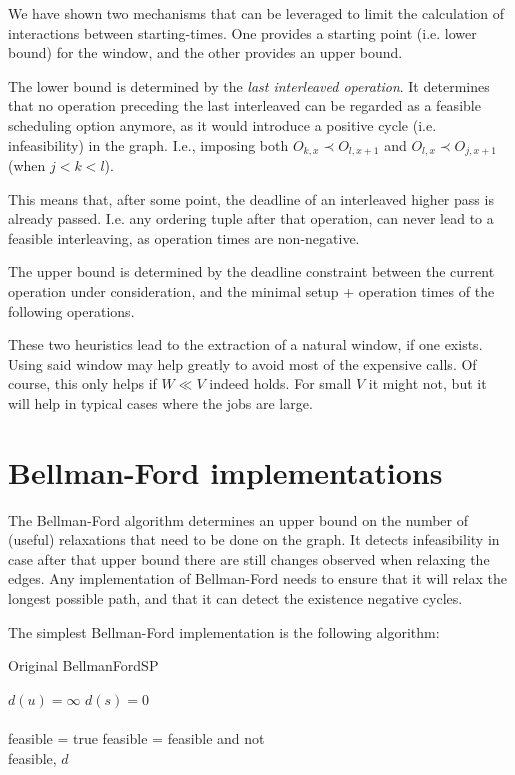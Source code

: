 \documentclass[]{article}
\begin{document}
We have shown two mechanisms that can be leveraged to limit the calculation of interactions between starting-times. One provides a starting point (i.e. lower bound) for the window, and the other provides an upper bound.

The lower bound is determined by the \textit{last interleaved operation}. It determines that no operation preceding the last interleaved can be regarded as a feasible scheduling option anymore, as it would introduce a positive cycle (i.e. infeasibility) in the graph. I.e., imposing both $O_{k, x} \prec O_{l, x+1}$ and $O_{l, x} \prec O_{j, x+1}$ (when $j < k < l$). 

This means that, after some point, the deadline of an interleaved higher pass is already passed. I.e. any ordering tuple after that operation, can never lead to a feasible interleaving, as operation times are non-negative.

The upper bound is determined by the deadline constraint between the current operation under consideration, and the minimal setup + operation times of the following operations. 

These two heuristics lead to the extraction of a natural window, if one exists. Using said window may help greatly to avoid most of the expensive calls. Of course, this only helps if $W \ll V$ indeed holds. For small $V$ it might not, but it will help in typical cases where the jobs are large.

\section{Bellman-Ford implementations}

The Bellman-Ford algorithm determines an upper bound on the number of (useful) relaxations that need to be done on the graph. It detects infeasibility in case after that upper bound there are still changes observed when relaxing the edges. Any implementation of Bellman-Ford needs to ensure that it will relax the longest possible path, and that it can detect the existence negative cycles.

The simplest Bellman-Ford implementation is the following algorithm:

\begin{algorithm}
\caption{Original BellmanFordSP}    
\begin{algorithmic}[H]
        \State $d(u) = \infty$
    \EndFor
    \State $d(s) = 0$\\
    \State {}
            \State {}
        \EndFor
    \EndFor\\
    \State {}
    \State feasible = true
        \State feasible = feasible and not 
    \EndFor\\
    \State \Return feasible, $d$
    \EndFunction
\end{algorithmic}
\end{algorithm}
\end{document}

